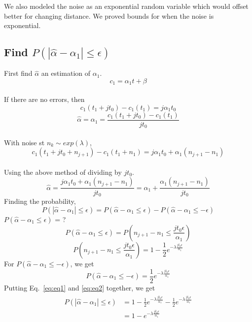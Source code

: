 \documentclass[10pt, journal, letter, onecolumn]{IEEEtran}
\begin{document}
We also modeled the noise as an exponential random variable which would offset better for changing distance. We proved bounds for when the noise is exponential.

\subsection{Find $P(| \hat{\alpha} - \alpha_1 | \leq \epsilon)$}
First find $\hat{\alpha}$ an estimation of $\alpha_1$.
\[c_1 = \alpha_1 t + \beta \] \\
If there are no errors, then
\[ c_1(t_1 + j t_0) - c_1(t_1) = j \alpha_1 t_0 \]
\[
\hat{\alpha} = \alpha_1 = \frac{c_1(t_1 + j t_0) - c_1(t_1)}{j t_0}
\] \\
With noise st $n_k \sim exp(\lambda)$,
\[
 c_1(t_1 + j t_0 + n_{j+1}) - c_1(t_1 + n_1) = j \alpha_1 t_0 + \alpha_1 (n_{j+1} - n_1)
\] \\
Using the above method of dividing by $j t_0$.
\[
\hat{\alpha} = \frac{ j \alpha_1 t_0 + \alpha_1 (n_{j+1} - n_1)}{j t_0} = \alpha_1 +  \frac{  \alpha_1 (n_{j+1} - n_1)}{j t_0}
\]
Finding the probability,
\[
P(| \hat{\alpha} - \alpha_1 | \leq \epsilon) = P(\hat{\alpha} - \alpha_1  \leq \epsilon) - P(\hat{\alpha} - \alpha_1  \leq -\epsilon)
\]
$P(\hat{\alpha} - \alpha_1  \leq \epsilon) $ = ?
\[
P( \hat{\alpha} - \alpha_1  \leq \epsilon ) = P \left( n_{j+1} - n_1 \leq \frac{j t_0 \epsilon}{\alpha_1} \right)
\]
\begin{equation}
P \left( n_{j+1} - n_1 \leq \frac{j t_0 \epsilon}{\alpha_1} \right) = 1 - \frac{1}{2} e^{ -\lambda  \frac{j t_0 \epsilon}{\alpha_1} }
\label{eq:eq1}
\end{equation}
For $P(\hat{\alpha} - \alpha_1  \leq -\epsilon) $, we get
\begin{equation}
P(\hat{\alpha} - \alpha_1  \leq -\epsilon) = \frac{1}{2} e^{ -\lambda  \frac{j t_0 \epsilon}{\alpha_1} }
\label{eq:eq2}
\end{equation}
Putting Eq.~\eqref{eq:eq1} and \eqref{eq:eq2} together, we get
\begin{eqnarray}
\begin{aligned}
P(| \hat{\alpha} - \alpha_1 | \leq \epsilon)  &= 1 - \frac{1}{2} e^{ -\lambda  \frac{j t_0 \epsilon}{\alpha_1} } - \frac{1}{2} e^{ -\lambda  \frac{j t_0 \epsilon}{\alpha_1} }\\
&= 1 - e^{ -\lambda  \frac{j t_0 \epsilon}{\alpha_1} }
\label{eq:main}
\end{aligned}
\end{eqnarray}
\end{document}
